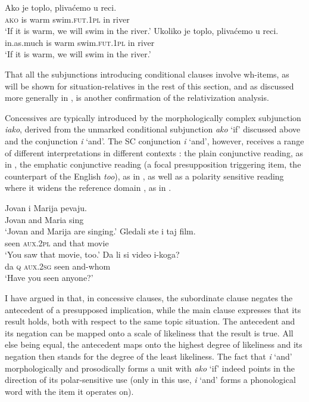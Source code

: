 \documentclass[output=paper,
colorlinks,
citecolor=brown,
newtxmath
]{langscibook}
\begin{document}
\ea\label{ex:Cond-clauses1}
    \ea \gll Ako je toplo, plivaćemo u reci.\\
    \textsc{ako} is warm swim.\textsc{fut.1pl} in river\\
    \glt `If it is warm, we will swim in the river.'\label{ex:Cond-clauses-a}
	\ex \gll Ukoliko je toplo, plivaćemo u reci.\\
    in.as.much is warm swim.\textsc{fut.1pl} in river\\
    \glt `If it is warm, we will swim in the river.'\label{ex:Cond-clauses-b}
\z\z

\noindent That all the subjunctions introducing conditional clauses involve wh-items, as will be shown for situation-relatives in the rest of this section, and as discussed more generally in \cite{Arsenijevic2006}, is another confirmation of the relativization analysis.

Concessives are typically introduced by the morphologically complex subjunction \textit{iako}, derived from the unmarked conditional subjunction \textit{ako} `if' discussed above and the conjunction \textit{i} `and'. The SC conjunction \textit{i} `and', however, receives a range of different interpretations in different contexts \citep{Arsenijevic2011}: the plain conjunctive reading, as in , the emphatic conjunctive reading (a focal presupposition triggering item, the counterpart of the English \textit{too}), as in , as well as a polarity sensitive reading where it widens the reference domain \citep{Chierchia2006}, as in .

\ea\label{ex:i-uses1}
    \ea \gll Jovan i Marija pevaju.\\
    Jovan and Maria sing\\
    \glt `Jovan and Marija are singing.'\label{ex:i-uses-a}
	\ex \gll Gledali ste i taj film.\\
    seen \textsc{aux.2pl} and that movie\\
    \glt `You saw that movie, too.'\label{ex:i-uses-b}
	\ex \gll Da li si video i-koga?\\
    da \textsc{q} \textsc{aux.2sg} seen and-whom\\
    \glt `Have you seen anyone?'\label{ex:i-uses-c}
\z\z

\noindent I have argued in  that, in concessive clauses, the subordinate clause negates the antecedent of a presupposed implication, while the main clause expresses that its result holds, both with respect to the same topic situation. The antecedent and its negation can be mapped onto a scale of likeliness that the result is true. All else being equal, the antecedent maps onto the highest degree of likeliness and its negation then stands for the degree of the least likeliness. The fact that \textit{i} `and' morphologically and prosodically forms a unit with \textit{ako} `if' indeed points in the direction of its polar-sensitive use (only in this use, \textit{i} `and' forms a phonological word with the item it operates on).
\end{document}
